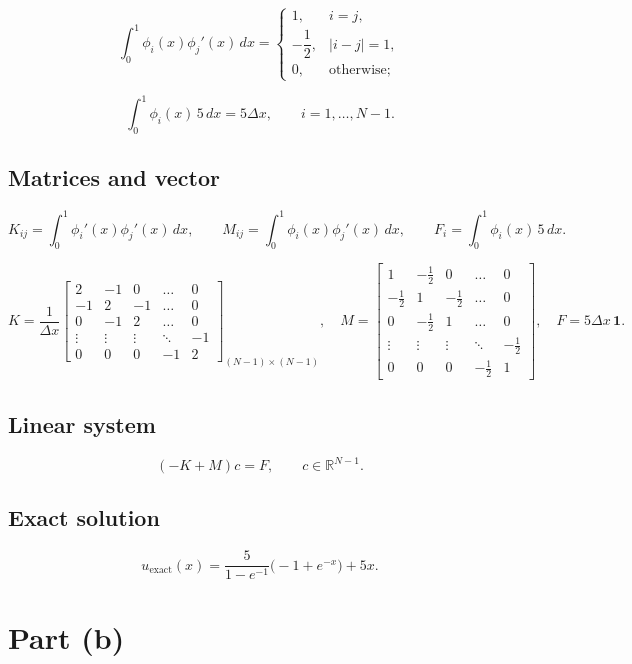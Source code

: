 \documentclass{article}
\begin{document}
\[
\int_0^1\phi_i(x)\phi_j'(x)\,dx=
\begin{cases}
1, & i=j,\\[6pt]
-\dfrac12, & |i-j|=1,\\[6pt]
0, & \text{otherwise};
\end{cases}
\]

\[
\int_0^1\phi_i(x)\,5\,dx=5\Delta x,\qquad i=1,\dots ,N-1.
\]

\subsection*{Matrices and vector}

\[
K_{ij}=\int_0^1\phi_i'(x)\phi_j'(x)\,dx,\qquad
M_{ij}=\int_0^1\phi_i(x)\phi_j'(x)\,dx,\qquad
F_i=\int_0^1\phi_i(x)\,5\,dx.
\]

\[
K=\frac1{\Delta x}
\begin{bmatrix}
 2&-1& 0&\dots &0\\
-1& 2&-1&\dots &0\\
 0&-1& 2&\dots &0\\
\vdots&\vdots&\vdots&\ddots&-1\\
 0& 0& 0&-1& 2
\end{bmatrix}_{(N-1)\times(N-1)},
\quad
M=
\begin{bmatrix}
 1&-\tfrac12&0&\dots &0\\
-\tfrac12&1&-\tfrac12&\dots &0\\
0&-\tfrac12&1&\dots &0\\
\vdots&\vdots&\vdots&\ddots&-\tfrac12\\
0&0&0&-\tfrac12&1
\end{bmatrix},
\quad
F=5\Delta x\,\mathbf 1.
\]

\subsection*{Linear system}

\[
(-K+M)c=F,\qquad c\in\mathbb R^{N-1}.
\]

\subsection*{Exact solution}

\[
u_{\mathrm{exact}}(x)=\frac{5}{1-e^{-1}}\bigl(-1+e^{-x}\bigr)+5x.
\]

\section*{Part (b)}
\end{document}
